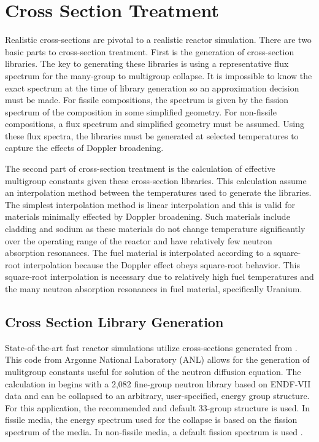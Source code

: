 \section{Cross Section Treatment}
  Realistic cross-sections are pivotal to a realistic reactor simulation. There
  are two basic parts to cross-section treatment. First is the generation of
  cross-section libraries. The key to generating these libraries is using a
  representative flux spectrum for the many-group to multigroup collapse. It is
  impossible to know the exact spectrum at the time of library generation so an
  approximation decision must be made.
  For fissile compositions, the spectrum is given by the
  fission spectrum of the composition in some simplified geometry. For 
  non-fissile compositions, a flux spectrum and simplified geometry must be 
  assumed.  Using these flux spectra, the libraries must be generated at 
  selected temperatures to capture the effects of Doppler broadening.

  The second part of cross-section treatment is the calculation of effective
  multigroup constants given these cross-section libraries. This calculation
  assume an interpolation method between the temperatures used to generate the
  libraries. The simplest interpolation method is linear interpolation and this
  is valid for materials minimally effected by Doppler broadening. Such 
  materials include cladding and sodium as these materials do not change
  temperature significantly over the operating range of the reactor and have
  relatively few neutron absorption resonances. The fuel material is
  interpolated according to a square-root interpolation because the Doppler
  effect obeys square-root behavior. This square-root interpolation is necessary
  due to relatively high fuel temperatures and the many neutron absorption
  resonances in fuel material, specifically Uranium.

  \subsection{Cross Section Library Generation}
    State-of-the-art fast reactor simulations utilize cross-sections generated
    from \mcc. This code from Argonne National Laboratory (ANL) allows for the
    generation of mulitgroup constants useful for solution of the neutron
    diffusion equation. The calculation in \mcc begins with a 2,082 fine-group
    neutron library based on ENDF-VII data and can be collapsed to an
    arbitrary, user-specified, energy group structure. For this application, the
    recommended and default 33-group structure is used. In fissile media, the
    energy spectrum used for the collapse is based on the fission spectrum of
    the media. In non-fissile media, a default  fission spectrum
    is used \cite{mcc}.
    
